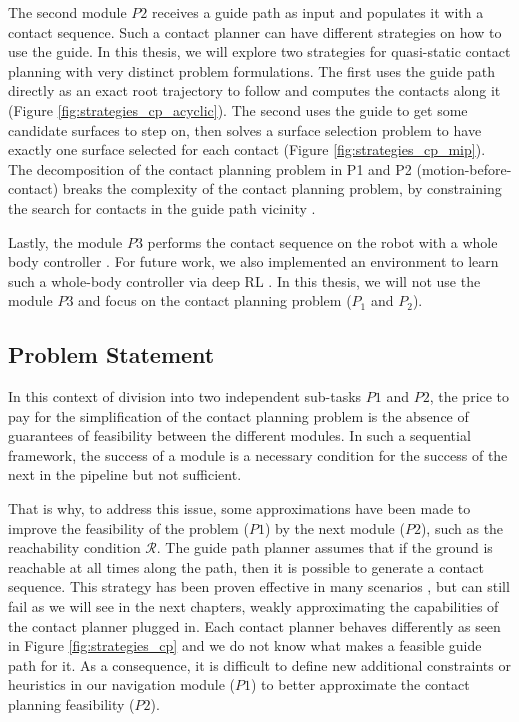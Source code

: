 The second module $P2$ receives a guide path as input and populates it with a contact sequence. Such a contact planner can have different strategies on how to use the guide. In this thesis, we will explore two strategies for quasi-static contact planning with very distinct problem formulations. 
The first uses the guide path directly as an exact root trajectory to follow and computes the contacts along it (Figure \ref{fig:strategies_cp_acyclic}).
The second uses the guide to get some candidate surfaces to step on, then solves a surface selection problem to have exactly one surface selected for each contact (Figure \ref{fig:strategies_cp_mip}).
The decomposition of the contact planning problem in P1 and P2 (motion-before-contact) breaks the complexity of the contact planning problem, by constraining the search for contacts in the guide path vicinity \cite{AcyclicCP,sl1m_v2}.

Lastly, the module $P3$ performs the contact sequence on the robot with a whole body controller \cite{loco3d, tsid_prete, deepLoco}. For future work, we also implemented an environment to learn such a whole-body controller via deep RL \cite{software_robot_RL}.
In this thesis, we will not use the module $P3$ and focus on the contact planning problem ($P_1$ and $P_2$).


\subsection{Problem Statement\label{subsub:problematic_leas}}

In this context of division into two independent sub-tasks $P1$ and $P2$, the price to pay for the simplification of the contact planning problem is the absence of guarantees of feasibility between the different modules.
In such a sequential framework, the success of a module is a necessary condition for the success of the next in the pipeline but not sufficient.

That is why, to address this issue, some approximations have been made to improve the feasibility of the problem ($P1$) by the next module ($P2$), such as the reachability condition $\mathcal{R}$. The guide path planner assumes that if the ground is reachable at all times along the path, then it is possible to generate a contact sequence. 
This strategy has been proven effective in many scenarios \cite{AcyclicCP}, but can still fail as we will see in the next chapters, weakly approximating the capabilities of the contact planner plugged in. Each contact planner behaves differently as seen in Figure \ref{fig:strategies_cp} and we do not know what makes a feasible guide path for it. As a consequence, it is difficult to define new additional constraints or heuristics in our navigation module ($P1$) to better approximate the contact planning feasibility ($P2$).


